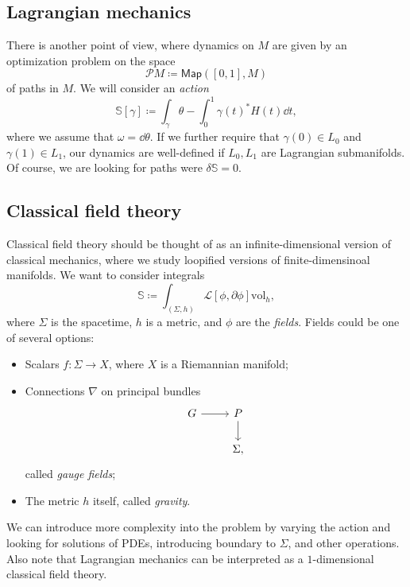 \documentclass[leqno, openany]{memoir}
\theoremstyle{definition}
\theoremstyle{remark}
\theoremstyle{plain}
\theoremstyle{definition}
\theoremstyle{remark}
\newcommand{\mc}[1]{\mathcal{#1}}
\newcommand{\mr}[1]{\mathrm{#1}}
\newcommand{\ms}[1]{\mathsf{#1}}
\begin{document}
\subsection{Lagrangian mechanics}
\label{subsec:lagrangian}

There is another point of view, where dynamics on $M$ are given by an optimization problem on the space
\[ \mc{P}M \coloneqq \ms{Map}([0,1], M) \]
of paths in $M$. We will consider an \textit{action}
\[ \mathbb{S}[\gamma] \coloneqq \int_{\gamma} \theta - \int_0^1 \gamma(t)^* H(t) \dd{t}, \]
where we assume that $\omega = \dd{\theta}$. If we further require that $\gamma(0) \in L_0$ and $\gamma(1) \in L_1$, our dynamics are well-defined if $L_0, L_1$ are Lagrangian submanifolds. Of course, we are looking for paths were $\delta \mathbb{S} = 0$.

\subsection{Classical field theory}
\label{subsec:classicalft}

Classical field theory should be thought of as an infinite-dimensional version of classical mechanics, where we study loopified versions of finite-dimensinoal manifolds. We want to consider integrals
\[ \mathbb{S} \coloneqq \int_{(\Sigma, h)} \mc{L}[\phi, \partial \phi] \mr{vol}_h, \]
where $\Sigma$ is the spacetime, $h$ is a metric, and $\phi$ are the \textit{fields}. Fields could be one of several options:
\begin{itemize}
\item Scalars $f \colon \Sigma \to X$, where $X$ is a Riemannian manifold;
\item Connections $\nabla$ on principal bundles
  \begin{equation*}
    \begin{tikzcd}
      G \ar{r} & P \ar{d} \\
      & \Sigma,
    \end{tikzcd}
  \end{equation*}
  called \textit{gauge fields};
  \item The metric $h$ itself, called \textit{gravity}.
\end{itemize}

We can introduce more complexity into the problem by varying the action and looking for solutions of PDEs, introducing boundary to $\Sigma$, and other operations. Also note that Lagrangian mechanics can be interpreted as a $1$-dimensional classical field theory.
\end{document}
